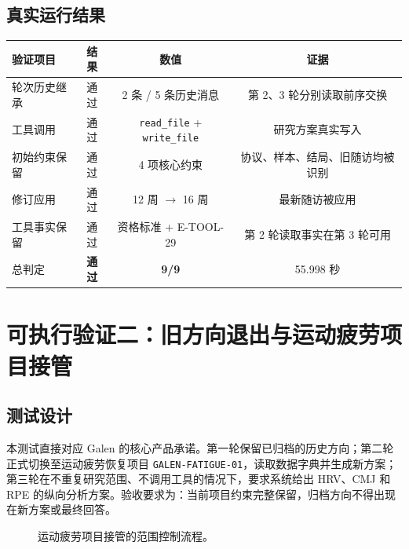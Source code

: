 \documentclass[11pt,a4paper]{article}
\begin{document}
\subsection{真实运行结果}
\begin{center}
\begin{tabularx}{\linewidth}{@{}Yccc@{}}
\toprule
验证项目 & 结果 & 数值 & 证据 \\
\midrule
轮次历史继承 & 通过 & 2 条 / 5 条历史消息 & 第 2、3 轮分别读取前序交换 \\
工具调用 & 通过 & \texttt{read\_file} + \texttt{write\_file} & 研究方案真实写入 \\
初始约束保留 & 通过 & 4 项核心约束 & 协议、样本、结局、旧随访均被识别 \\
修订应用 & 通过 & 12 周 $\rightarrow$ 16 周 & 最新随访被应用 \\
工具事实保留 & 通过 & 资格标准 + E-TOOL-29 & 第 2 轮读取事实在第 3 轮可用 \\
总判定 & \textbf{通过} & \textbf{9/9} & 55.998 秒 \\
\bottomrule
\end{tabularx}
\end{center}

\section{可执行验证二：旧方向退出与运动疲劳项目接管}
\subsection{测试设计}
本测试直接对应 Galen 的核心产品承诺。第一轮保留已归档的历史方向；第二轮正式切换至运动疲劳恢复项目 \texttt{GALEN-FATIGUE-01}，读取数据字典并生成新方案；第三轮在不重复研究范围、不调用工具的情况下，要求系统给出 HRV、CMJ 和 RPE 的纵向分析方案。验收要求为：当前项目约束完整保留，归档方向不得出现在新方案或最终回答。

\begin{figure}[htbp]
\centering
{}
\caption{运动疲劳项目接管的范围控制流程。}
\end{figure}
\end{document}
